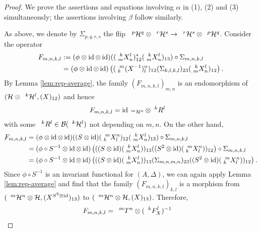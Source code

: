 \begin{proof}
  We prove the assertions and equations involving $\alpha$ in (1), (2)
  and (3)  simultaneously; the assertions involving $\beta$  follow similarly.

  As above, we denote by $\Sigma_{p,q,r,s}$ the flip
  $\Gru{\mathcal{H}}{p}{q} \otimes \Gru{\mathcal{H}}{r}{s} \to
  \Gru{\mathcal{H}}{r}{s} \otimes \Gru{\mathcal{H}}{p}{q}$.  Consider
  the operator
  \begin{align*}
    F_{m,n,k,l}
    &:=(\phi \otimes \id \otimes \id)((\Gr{X}{k}{l}{m}{n})_{12}^{*}(\Gr{X}{k}{l}{m}{n})_{13})
    \circ \Sigma_{m,n,k,l} \\ &= (\phi \otimes \id \otimes
    \id)\left((\Gr{(X^{-1})}{m}{n}{k}{l})_{12}
      (\Sigma_{k,l,k,l})_{23}(\Gr{X}{k}{l}{m}{n})_{12}\right).
  \end{align*}
  By Lemma \ref{lem:rep-average}, the family $(F_{m,n,k,l})_{m,n}$ is
  an endomorphism of $(\mathcal{H} \otimes \Gru{\mathcal{H}}{k}{l}, (X)_{12})$ and hence
  \begin{align}
    F_{m,n,k,l} &= \id_{\Gru{\mathcal{H}}{m}{n}} \otimes \Gru{R}{k}{l} \label{eq:rep-orthogonal-1}
  \end{align}
  with some $\Gru{R}{k}{l} \in \mathcal{B}(\Gru{\mathcal{H}}{k}{l})$ not
  depending on $m,n$.
  On the other hand, 
  \begin{align*}
    F_{m,n,k,l} &= (\phi \otimes \id \otimes \id)((S \otimes
    \id)(\Gr{X}{m}{n}{k}{l})_{12}(\Gr{X}{k}{l}{m}{n})_{13})
    \circ \Sigma_{m,n,k,l} \\
    &= (\phi\circ S^{-1} \otimes \id \otimes \id)\left(((S \otimes
      \id)(\Gr{X}{k}{l}{m}{n}))_{13}
      ((S^{2} \otimes \id)(\Gr{X}{m}{n}{k}{l}))_{12}\right)     \circ \Sigma_{m,n,k,l}\\
    &= (\phi\circ S^{-1} \otimes \id \otimes \id)\left(((S \otimes
      \id)(\Gr{X}{k}{l}{m}{n}))_{13} (\Sigma_{m,n,m,n})_{23} ((S^{2}
      \otimes \id)(\Gr{X}{m}{n}{k}{l}))_{12}\right).
  \end{align*}
  Since $\phi\circ S^{-1}$ is an invariant functional for
  $(A,\Delta)$, we can again apply Lemma \ref{lem:rep-average} and
  find that the family $(F_{m,n,k,l})_{k,l}$ is a morphism from
  $(\Gru{\mathcal{H}}{m}{n} \otimes \mathcal{H}, (X^{S^{2} \otimes
    \id})_{13})$ to $(\Gru{\mathcal{H}}{m}{n} \otimes \mathcal{H},
  (X)_{13})$. Therefore,
  \begin{align}
    F_{m,n,k,l} &= \Gru{T}{m}{n} \otimes (\Gru{F_{X}}{k}{l})^{-1} \label{eq:rep-orthogonal-2}
  \end{align}

\end{proof}
